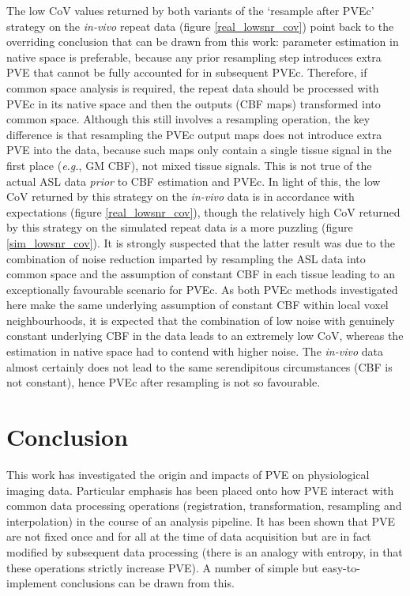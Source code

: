 The low CoV values returned by both variants of the `resample after PVEc' strategy on the \textit{in-vivo} repeat data (figure \ref{real_lowsnr_cov}) point back to the overriding conclusion that can be drawn from this work: parameter estimation in native space is preferable, because any prior resampling step introduces extra PVE that cannot be fully accounted for in subsequent PVEc. Therefore, if common space analysis is required, the repeat data should be processed with PVEc in its native space and then the outputs (CBF maps) transformed into common space. Although this still involves a resampling operation, the key difference is that resampling the PVEc output maps does not introduce extra PVE into the data, because such maps only contain a single tissue signal in the first place (\textit{e.g.}, GM CBF), not mixed tissue signals. This is not true of the actual ASL data \textit{prior} to CBF estimation and PVEc. In light of this, the low CoV returned by this strategy on the \textit{in-vivo} data is in accordance with expectations (figure \ref{real_lowsnr_cov}), though the relatively high CoV returned by this strategy on the simulated repeat data is a more puzzling (figure \ref{sim_lowsnr_cov}). It is strongly suspected that the latter result was due to the combination of noise reduction imparted by resampling the ASL data into common space and the assumption of constant CBF in each tissue leading to an exceptionally favourable scenario for PVEc. As both PVEc methods investigated here make the same underlying assumption of constant CBF within local voxel neighbourhoods, it is expected that the combination of low noise with genuinely constant underlying CBF in the data leads to an extremely low CoV, whereas the estimation in native space had to contend with higher noise. The \textit{in-vivo} data almost certainly does not lead to the same serendipitous circumstances (CBF is not constant), hence PVEc after resampling is not so favourable. 


\section{Conclusion}

This work has investigated the origin and impacts of PVE on physiological imaging data. Particular emphasis has been placed onto how PVE interact with common data processing operations (registration, transformation, resampling and interpolation) in the course of an analysis pipeline. It has been shown that PVE are not fixed once and for all at the time of data acquisition but are in fact modified by subsequent data processing (there is an analogy with entropy, in that these operations strictly increase PVE). A number of simple but easy-to-implement conclusions can be drawn from this. 

